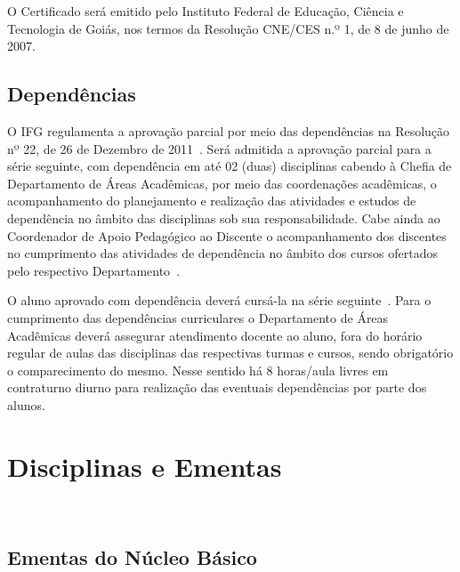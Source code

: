 \documentclass[11pt,fleqn]{book} %
\begin{document}
O Certificado será emitido pelo Instituto Federal de Educação, Ciência e Tecnologia de Goiás, nos termos da Resolução CNE/CES n.º 1, de 8 de junho de 2007.	


\section{Dependências}
\indent

O IFG regulamenta a aprovação parcial por meio das dependências na Resolução nº 22, de 26 de Dezembro de 2011~\cite{Resolucao22De2011}.
Será admitida a aprovação parcial para a série seguinte, com dependência em até 02 (duas) disciplinas cabendo à Chefia de Departamento de Áreas Acadêmicas, por meio das coordenações acadêmicas, o acompanhamento do planejamento e realização das atividades e estudos de dependência no âmbito das disciplinas sob sua responsabilidade.
Cabe ainda ao Coordenador de Apoio Pedagógico ao Discente o acompanhamento dos discentes no cumprimento das atividades de dependência no âmbito dos cursos ofertados pelo respectivo Departamento~\cite{Resolucao22De2011}.

O aluno aprovado com dependência deverá cursá-la na série seguinte~\cite{Resolucao22De2011}.
Para o cumprimento das dependências curriculares o Departamento de Áreas Acadêmicas deverá assegurar atendimento docente ao aluno, fora do horário regular de aulas das disciplinas das respectivas turmas e cursos, sendo obrigatório o comparecimento do mesmo.
Nesse sentido há 8 horas/aula livres em contraturno diurno para realização das eventuais dependências por parte dos alunos.


\chapter{Disciplinas e Ementas}
\vspace{6em}
\begin{flushright}
	\textit{\textcolor{white}{Foto: Adriano Darosci}}
\end{flushright}
\vspace{12em}

\section{Ementas do Núcleo Básico}\label{ementasBasico}
\indent
\end{document}
